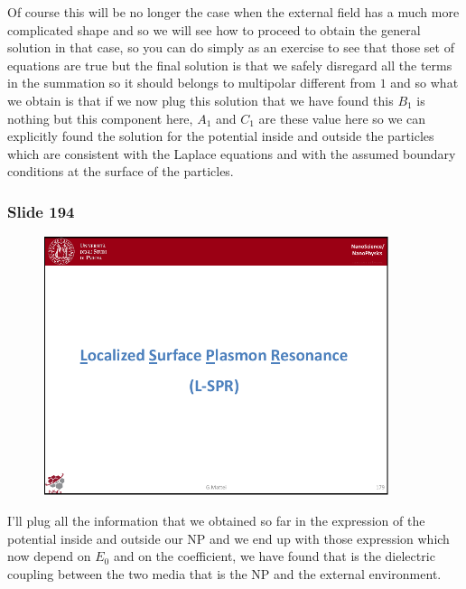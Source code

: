 \documentclass[../main/main.tex]{subfiles}
\begin{document}
Of course this will be no longer the case when the external field has a much more complicated shape and so we will see how to proceed to obtain the general solution in that case, so you can do simply as an exercise to see that those set of equations are true but the final solution is that we safely disregard all the terms in the summation so it should belongs to multipolar different from $1$ and so what we obtain is that if we now plug this solution that we have found this $B_1$ is nothing but this component here, $A_1$ and $C_1$ are these value here so we can explicitly found the solution for the potential inside and outside the particles which are consistent with the Laplace equations and with the assumed boundary conditions at the surface of the particles.

\newpage
\subsubsection{Slide 194}

\begin{figure}[h!]
\centering
\includegraphics[page=16,width=0.9\textwidth]{../lessons/pdf_file/11_lesson.pdf}
\end{figure}

I'll plug all the information that we obtained so far in the expression of the potential inside and outside our NP and we end up with those expression which now depend on $E_0$ and on the coefficient, we have found that is the dielectric coupling between the two media that is the NP and the external environment. 
\end{document}
